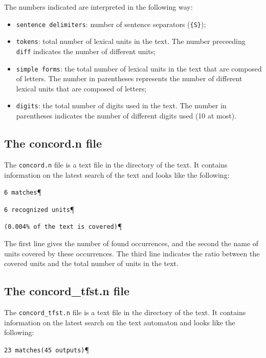 \bigskip
\noindent The numbers indicated are interpreted in the following way:
\begin{itemize}
  \item \verb+sentence delimiters+: number of sentence separators
  (\verb+{S}+);

  \item \verb+tokens+: total number of lexical units in the text. The number
  preceeding \verb+diff+ indicates the number of different units;

  \item \verb+simple forms+: the total number of lexical units in the text that
  are composed of letters. The number in parentheses represents the number of
  different lexical units that are composed of letters;

  \item \verb+digits+: the total number of digits used in the text. The number in
  parentheses indicates the number of different digits used (10 at most).

\end{itemize}


\subsection{The concord.n file}
The \verb+concord.n+ file is a text file in the directory of the text. It
contains information on the latest search of the text and looks like the
following:


\bigskip
\verb$6 matches$\P

\verb$6 recognized units$\P

\verb$(0.004% of the text is covered)$\P

\bigskip
\noindent The first line gives the number of found occurrences, and the second the name of
units covered by these occurrences. The third line indicates the ratio between
the covered units and the total number of units in the text.


\subsection{The concord\_tfst.n file}
The \verb+concord_tfst.n+ file is a text file in the directory of the text. It
contains information on the latest search on the text automaton and looks like
the following:

\bigskip
\verb$23 matches(45 outputs)$\P




